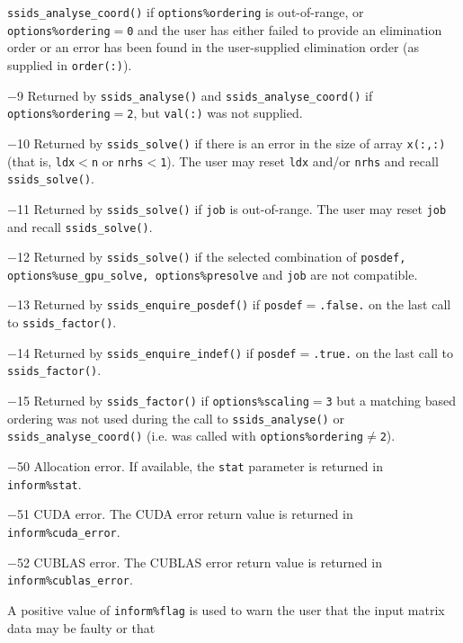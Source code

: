 \begin{description}
            {\tt ssids\_analyse\_coord()} if {\tt options\%ordering} is
            out-of-range, or {\tt options\%ordering}$=${\tt 0} and the user
            has either failed to provide an elimination order or an error has
            been found in the user-supplied elimination order (as supplied in
            {\tt order(:)}).
\item{$-$9} Returned by {\tt ssids\_analyse()} and
            {\tt ssids\_analyse\_coord()} if {\tt options\%ordering}$=${\tt 2},
            but {\tt val(:)} was not supplied.
\item{$-$10} Returned by {\tt ssids\_solve()} if there is an error in the size
            of array {\tt x(:,:)} (that is, {\tt ldx$<$n} or {\tt nrhs$<$1}).
            The user may reset {\tt ldx} and/or {\tt nrhs} and recall
            {\tt ssids\_solve()}.
\item{$-$11} Returned by {\tt ssids\_solve()} if {\tt job} is out-of-range.
            The user may reset {\tt job} and recall {\tt ssids\_solve()}.
\item{$-$12} Returned by {\tt ssids\_solve()} if the selected combination of
            {\tt posdef{\rm ,} options\%use\_gpu\_solve{\rm ,}
            options\%presolve} and {\tt job} are not compatible.
\item{$-$13} Returned by {\tt ssids\_enquire\_posdef()} if
            {\tt posdef}$=${\tt .false.} on the last call
            to {\tt ssids\_factor()}.
\item{$-$14} Returned by {\tt ssids\_enquire\_indef()} if
            {\tt posdef}$=${\tt .true.} on the last call to
            {\tt ssids\_factor()}.
\item{$-$15} Returned by {\tt ssids\_factor()} if {\tt options\%scaling$=$3}
            but a matching based ordering was not used during the call to
            {\tt ssids\_analyse()} or {\tt ssids\_analyse\_coord()} (i.e. was
            called with
            {\tt options\%ordering}$\ne${\tt 2}).
\item{$-$50} Allocation error. If available, the {\tt stat}
            parameter is returned in {\tt inform\%stat}.
\item{$-$51} CUDA error. The CUDA error return value is returned in
            {\tt inform\%cuda\_error}.
\item{$-$52} CUBLAS error. The CUBLAS error return value is returned in
            {\tt inform\%cublas\_error}.
\end{description}
A positive value of {\tt inform\%flag}
is used to warn the user that the input matrix data may be faulty or that
